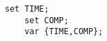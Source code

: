 \documentclass{article}
\begin{document}
  \begin{lstlisting}[language=AMPL]
    set TIME;
    set COMP;
    var {TIME,COMP};
  \end{lstlisting}
\end{document}
